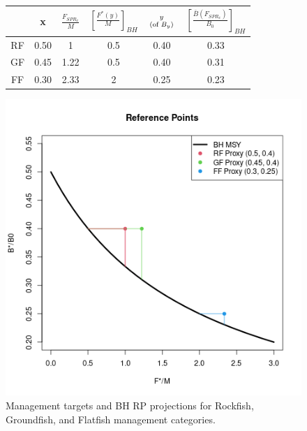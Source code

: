 
\begin{figure}
\begin{minipage}[h!]{0.66\textwidth}
\begin{tabular}{c|c|c|c|c|c}
   & x    & $\frac{F_{SPR_x}}{M}$ & $\left[\frac{F^*(y)}{M}\right]_{BH}$ & $y \atop (\text{of }B_y)$ & $\left[\frac{\bar B(F_{SPR_x})}{B_0}\right]_{BH}$ \\ \hline %
RF & 0.50 & 1			  & 0.5 				     & 0.40  	 & 0.33 \\ %
GF & 0.45 & 1.22 		  & 0.5 				     & 0.40  	 & 0.31 \\ %
FF & 0.30 & 2.33		  & 2 				     & 0.25  	 & 0.23 \\ %
\end{tabular}
\caption{ \label{proxyTable}
Management targets and BH RP projections for Rockfish, Groundfish, and Flatfish management categories.
}
\end{minipage}
\begin{minipage}[h!]{0.33\textwidth}
\includegraphics[width=\textwidth]{../gpBias/rpProxTable.png}
\end{minipage}
\end{figure}

